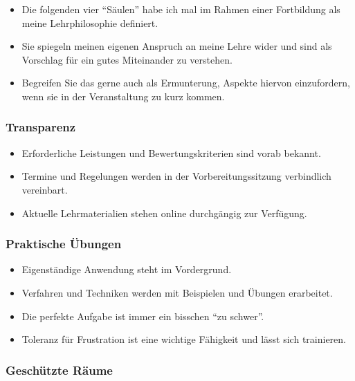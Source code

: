 \documentclass[11pt,german,a4paper]{article}
\providecommand{\tightlist}{%
  \setlength{\itemsep}{0pt}\setlength{\parskip}{0pt}}
\begin{document}
\begin{itemize}
\tightlist
\item
  Die folgenden vier ``Säulen'' habe ich mal im Rahmen einer Fortbildung als meine Lehrphilosophie definiert.
\item
  Sie spiegeln meinen eigenen Anspruch an meine Lehre wider und sind als Vorschlag für ein gutes Miteinander zu verstehen.
\item
  Begreifen Sie das gerne auch als Ermunterung, Aspekte hiervon einzufordern, wenn sie in der Veranstaltung zu kurz kommen.
\end{itemize}

\hypertarget{transparenz}{%
\subsubsection{Transparenz}\label{transparenz}}

\begin{itemize}
\tightlist
\item
  Erforderliche Leistungen und Bewertungskriterien sind vorab bekannt.
\item
  Termine und Regelungen werden in der Vorbereitungssitzung verbindlich vereinbart.
\item
  Aktuelle Lehrmaterialien stehen online durchgängig zur Verfügung.
\end{itemize}

\hypertarget{praktische-uxfcbungen}{%
\subsubsection{Praktische Übungen}\label{praktische-uxfcbungen}}

\begin{itemize}
\tightlist
\item
  Eigenständige Anwendung steht im Vordergrund.
\item
  Verfahren und Techniken werden mit Beispielen und Übungen erarbeitet.
\item
  Die perfekte Aufgabe ist immer ein bisschen ``zu schwer''.
\item
  Toleranz für Frustration ist eine wichtige Fähigkeit und lässt sich trainieren.
\end{itemize}

\hypertarget{geschuxfctzte-ruxe4ume}{%
\subsubsection{Geschützte Räume}\label{geschuxfctzte-ruxe4ume}}
\end{document}
